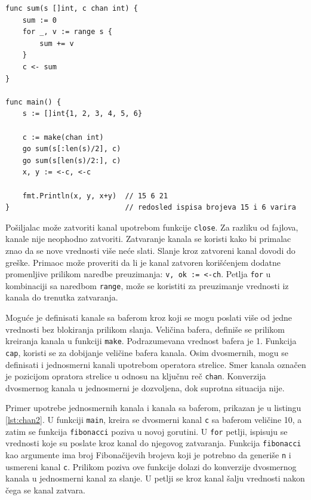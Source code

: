 \documentclass[12pt,oneside]{memoir}
\begin{document}
\begin{center}
\begin{lstlisting}[caption=Primer upotrebe kanala, label={lst:chan1},  backgroundcolor=\color{background}]
func sum(s []int, c chan int) {
	sum := 0
	for _, v := range s {
		sum += v
	}
	c <- sum 
}

func main() {
	s := []int{1, 2, 3, 4, 5, 6}

	c := make(chan int)
	go sum(s[:len(s)/2], c)
	go sum(s[len(s)/2:], c)
	x, y := <-c, <-c 

	fmt.Println(x, y, x+y)	// 15 6 21 
}							// redosled ispisa brojeva 15 i 6 varira
\end{lstlisting}
\end{center}

Pošiljalac može zatvoriti kanal upotrebom funkcije \texttt{close}. Za razliku od fajlova, kanale nije neophodno zatvoriti. Zatvaranje kanala se koristi kako bi primalac znao da se nove vrednosti više neće slati. Slanje kroz zatvoreni kanal dovodi do greške. Primaoc može proveriti da li je kanal zatvoren korišćenjem dodatne promenljive prilikom naredbe preuzimanja: \texttt{v, ok := <-ch}. Petlja \texttt{for} u kombinaciji sa naredbom \texttt{range}, može se koristiti za preuzimanje vrednosti iz kanala do trenutka zatvaranja. 

Moguće je definisati kanale sa baferom kroz koji se mogu poslati više od jedne vrednosti bez blokiranja prilikom slanja. Veličina bafera, definiše se prilikom kreiranja kanala u funkciji \texttt{make}. Podrazumevana vrednost bafera je 1. Funkcija \texttt{cap}, koristi se za dobijanje veličine bafera kanala. Osim dvosmernih, mogu se definisati i jednosmerni kanali upotrebom operatora strelice. Smer kanala označen je pozicijom opratora strelice u odnosu na ključnu reč \texttt{chan}. Konverzija dvosmernog kanala u jednosmerni je dozvoljena, dok suprotna situacija nije. 

Primer upotrebe jednosmernih kanala i kanala sa baferom, prikazan je u listingu \ref{lst:chan2}. U funkciji \texttt{main}, kreira se dvosmerni kanal \texttt{c} sa baferom veličine 10, a zatim se funkcija \texttt{fibonacci} poziva u novoj gorutini. U \texttt{for} petlji, ispisuju se vrednosti koje su poslate kroz kanal do njegovog zatvaranja. Funkcija \texttt{fibonacci} kao argumente ima  broj Fibonačijevih brojeva koji je potrebno da generiše \texttt{n} i usmereni kanal \texttt{c}. Prilikom poziva ove funkcije dolazi do konverzije dvosmernog kanala u jednosmerni kanal za slanje. U petlji se kroz kanal šalju vrednosti nakon čega se kanal zatvara.
\end{document}
